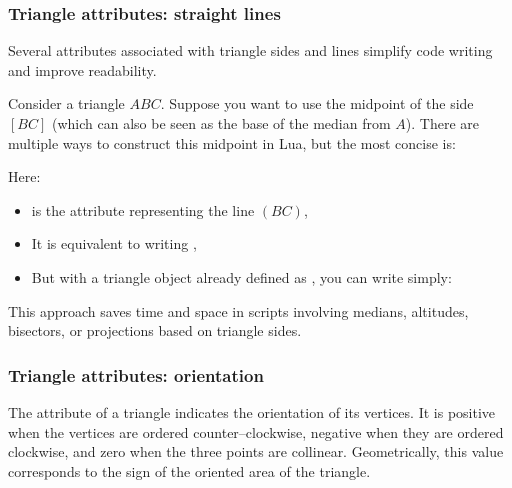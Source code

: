 \subsubsection{Triangle attributes: straight lines}
\label{ssub:triangle_attributes_straight_lines}

Several attributes associated with triangle sides and lines simplify code writing and improve readability.

\medskip

Consider a triangle $ABC$. Suppose you want to use the midpoint of the side $[BC]$ (which can also be seen as the base of the median from $A$). There are multiple ways to construct this midpoint in Lua, but the most concise is:

\begin{center}
\end{center}


Here:
\begin{itemize}
  \item {} is the attribute representing the line $(BC)$,
  \item It is equivalent to writing ,
  \item But with a triangle object already defined as , you can write simply:
  \begin{center}
  \end{center}
\end{itemize}

\medskip

This approach saves time and space in scripts involving medians, altitudes, bisectors, or projections based on triangle sides.

\vspace{1em}

\begin{tkzexample}[latex=.5\textwidth]
\end{tkzexample}

\subsubsection{Triangle attributes: orientation}
\label{ssub:triangle_attributes_orientation}
The  attribute of a triangle indicates the orientation
of its vertices.
It is positive when the vertices are ordered counter--clockwise,
negative when they are ordered clockwise,
and zero when the three points are collinear.
Geometrically, this value corresponds to the sign of the oriented area
of the triangle.


